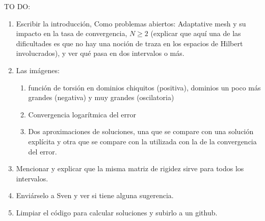 \documentclass[11 pt]{article}
\numberwithin{equation}{section}
\begin{document}
 
 
 



\newpage

{\Huge  TO DO:}
\begin{enumerate}
    \item Escribir la introducción, Como problemas abiertos: Adaptative mesh y su impacto en la tasa de convergencia, $N\geq 2$ (explicar que aquí una de las dificultades es que no hay una noción de traza en los espacios de Hilbert involucrados), y ver qué pasa en dos intervalos o más.
    \item Las imágenes: 
    \begin{enumerate}
        \item función de torsión en dominios chiquitos (positiva), dominios un poco más grandes (negativa) y muy grandes (oscilatoria)
        \item Convergencia logarítmica del error
        \item Dos aproximaciones de soluciones, una que se compare con una solución explícita y otra que se compare con la utilizada con la de la convergencia del error.
    \end{enumerate}
    \item Mencionar y explicar que la misma matriz de rigidez sirve para todos los intervalos.
    \item Enviárselo a Sven y ver si tiene alguna sugerencia. 
    \item Limpiar el código para calcular soluciones y subirlo a un github.
\end{enumerate}
\end{document}
